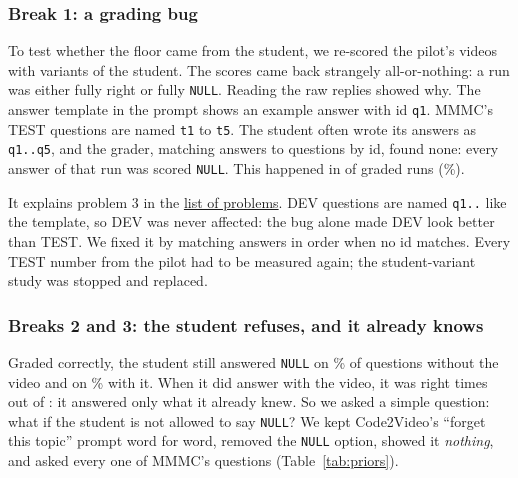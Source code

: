 \documentclass[11pt]{article}
\begin{document}


\subsubsection*{Break 1: a grading bug}\label{sec:idbug}

To test whether the floor came from the student, we re-scored the pilot's videos with variants of the student. The
scores came back strangely all-or-nothing: a run was either fully right or fully \texttt{NULL}. Reading the raw
replies showed why. The answer template in the prompt shows an example answer with id \texttt{q1}. MMMC's TEST
questions are named \texttt{t1} to \texttt{t5}. The student often wrote its answers as \texttt{q1..q5}, and the grader,
matching answers to questions by id, found none: every answer of that run was scored \texttt{NULL}. This happened in
\OrderRuns{} of \AllRuns{} graded runs (\OrderShare\%).

\DiagIdBug

It explains problem 3 in the \hyperref[sec:breaks]{list of problems}. DEV questions are named \texttt{q1..} like the template, so DEV was never affected:
the bug alone made DEV look better than TEST. We fixed it by matching answers in order when no id matches. Every
TEST number from the pilot had to be measured again; the student-variant study was stopped and replaced.

\subsubsection*{Breaks 2 and 3: the student refuses, and it already knows}\label{sec:refuse}

Graded correctly, the student still answered \texttt{NULL} on \NullNoVideo\% of questions without the video and on
\NullWithVideo\% with it. When it did answer with the video, it was right \AnsweredRight{} times out of
\AnsweredWithVideo{}: it answered only what it already knew. So we asked a simple question: what if the student is not allowed to say \texttt{NULL}? We
kept Code2Video's ``forget this topic'' prompt word for word, removed the \texttt{NULL} option, showed it
\emph{nothing}, and asked every one of MMMC's questions (Table~\ref{tab:priors}).
\end{document}
